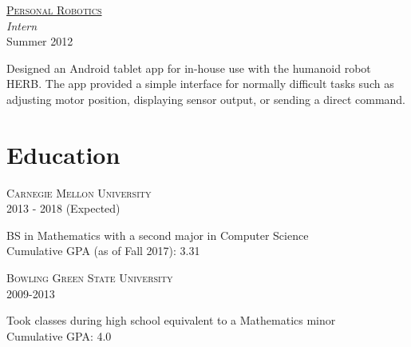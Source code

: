 \documentclass[letterpaper,10pt]{article}
\newcommand{\lb}{\vspace{4pt} \\}
\newenvironment{resumecols2}[2]
{
    \vspace{.11cm}
    \begin{minipage}[t]{.21\linewidth}
        \begin{flushright}
            \textsc{#1} \\
            \small{#2}
        \end{flushright}
    \end{minipage}
    \hspace{.005\linewidth}
    \begin{minipage}[t]{.77\linewidth}
}
{
    \end{minipage}
    \vspace{.11cm}
}
\newenvironment{resumecols}[4]
{
    \vspace{.11cm}
    \begin{minipage}[t]{.21\linewidth}
        \begin{flushright}
            \href{#2}{\textsc{#1}} \\
            \small{\textit{#3}} \\
            \small{#4}
        \end{flushright}
    \end{minipage}
    \hspace{.005\linewidth}
    \begin{minipage}[t]{.77\linewidth}
}
{
    \end{minipage}
    \vspace{.11cm}
}
\begin{document}
\begin{resumecols}{Personal Robotics}{https://personalrobotics.ri.cmu.edu}{Intern}{Summer 2012}
    Designed an Android tablet app for in-house use with the humanoid robot HERB. The app provided a simple interface for normally difficult tasks such as adjusting motor position, displaying sensor output, or sending a direct command.
\end{resumecols}

\section{Education}

\begin{resumecols2}{Carnegie Mellon University}{2013 - 2018 (Expected)}
    BS in Mathematics with a second major in Computer Science
    \lb
    Cumulative GPA (as of Fall 2017): 3.31
\end{resumecols2}

\begin{resumecols2}{Bowling Green State University}{2009-2013}
    Took classes during high school equivalent to a Mathematics minor
    \lb
    Cumulative GPA: 4.0
\end{resumecols2}
\end{document}
